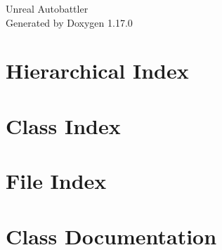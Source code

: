 \documentclass[twoside]{book}
\newcommand{\+}{\discretionary{\mbox{\scriptsize$\hookleftarrow$}}{}{}}
\newcommand{\clearemptydoublepage}{%
    \newpage{\pagestyle{empty}\cleardoublepage}%
  }
\begin{document}
  \raggedbottom
    \hypersetup{pageanchor=false,
                bookmarksnumbered=true,
                pdfencoding=unicode
               }
  \begin{titlepage}
  \vspace*{7cm}
  \begin{center}%
  {\Large Unreal Autobattler}\\
  \vspace*{1cm}
  {\large Generated by Doxygen 1.17.0}\\
  \end{center}
  \end{titlepage}
  \clearemptydoublepage
  \tableofcontents
  \clearemptydoublepage
  \hypersetup{pageanchor=true}
\chapter{Hierarchical Index}

\chapter{Class Index}

\chapter{File Index}

\chapter{Class Documentation}



















\end{document}
